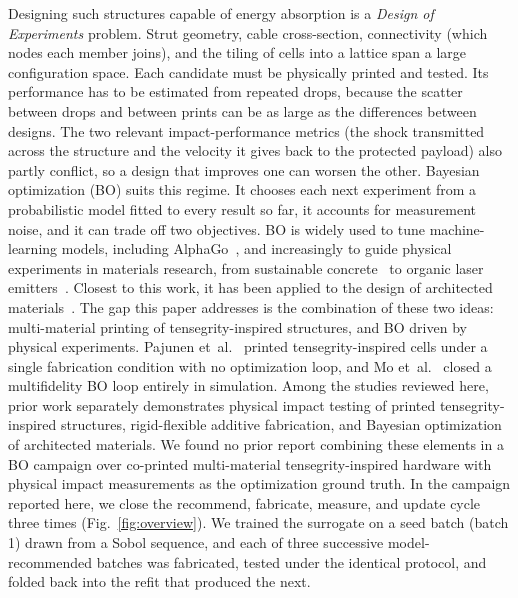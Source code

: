 \documentclass[lineno,nocopyright,upint,varvw,hyphenate]{asmejour}
\begin{document}
Designing such structures capable of energy absorption is a
\emph{Design of Experiments} problem. Strut geometry, cable
cross-section, connectivity (which nodes each member joins), and the
tiling of cells into a lattice span a large configuration space. Each candidate must be physically printed and
tested. Its performance has to be estimated from repeated drops,
because the scatter between drops and between prints can be as large as
the differences between designs. The two relevant impact-performance
metrics (the shock transmitted across the structure and the velocity it
gives back to the protected payload) also partly conflict, so a design
that improves one can worsen the other. Bayesian optimization (BO)
suits this regime. It chooses each next experiment from a probabilistic
model fitted to every result so far, it accounts for measurement noise,
and it can trade off two objectives. BO is widely used to tune
machine-learning models, including
AlphaGo~\citep{chen2018bayesianoptimizationalphago}, and increasingly to
guide physical experiments in materials research, from sustainable
concrete~\citep{ament2023sustainable} to organic laser
emitters~\citep{striethkalthoff2024delocalized}. Closest to this work,
it has been applied to the design of architected
materials~\citep{mo2023accelerated, zhang2021bo}.
The gap this paper addresses is the combination of these two ideas:
multi-material printing of tensegrity-inspired structures, and BO
driven by physical experiments.
Pajunen et~al.~\cite{pajunen2019design} printed tensegrity-inspired
cells under a single fabrication condition with no optimization loop,
and Mo et~al.~\cite{mo2023accelerated} closed a multifidelity BO loop
entirely in simulation. Among the studies reviewed here, prior work
separately demonstrates physical impact testing of printed
tensegrity-inspired structures, rigid-flexible additive fabrication,
and Bayesian optimization of architected materials. We found no prior
report combining these elements in a BO campaign over co-printed
multi-material tensegrity-inspired hardware with physical impact
measurements as the optimization ground truth. In the campaign reported
here, we close the recommend, fabricate, measure, and update cycle three
times (Fig.~\ref{fig:overview}). We trained the surrogate on a seed
batch (batch 1) drawn from a Sobol sequence, and each of three
successive model-recommended batches was fabricated, tested under the
identical protocol, and folded back into the refit that produced the
next.
\end{document}
